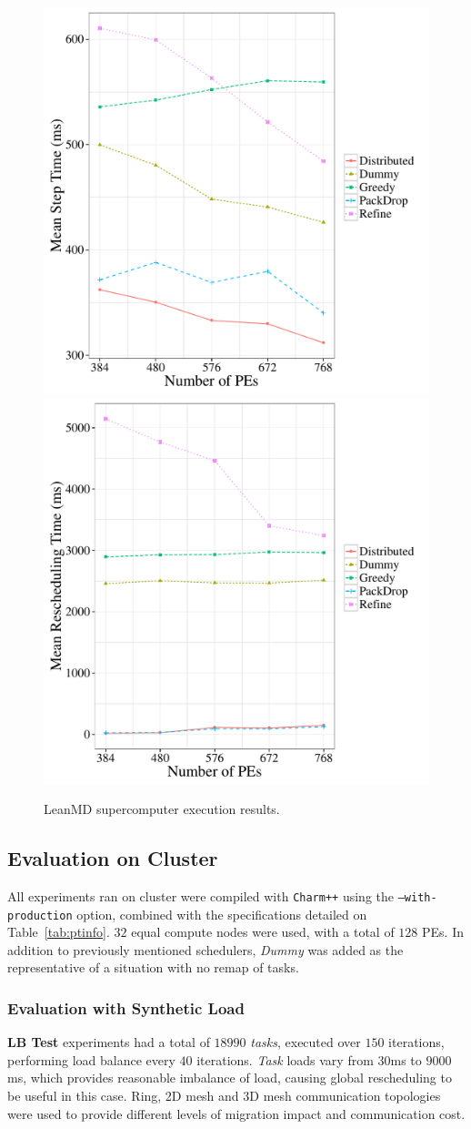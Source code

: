 \begin{figure}[!ht]
 \includegraphics[width=0.45\linewidth]{images/steptime_leanmd_sdumont.pdf}\includegraphics[width=0.45\linewidth]{images/schedtime_leanmd_sdumont.pdf}
 \caption{LeanMD supercomputer execution results.}
\end{figure}


\subsection{Evaluation on Cluster}

All experiments ran on cluster were compiled with \texttt{Charm++} using the \texttt{--with-production} option, combined with the specifications detailed on Table~\ref{tab:ptinfo}.
$32$ equal compute nodes were used, with a total of $128$ PEs.
In addition to previously mentioned schedulers, \textit{Dummy} was added as the representative of a situation with no remap of tasks.

\subsubsection*{Evaluation with Synthetic Load}

\textbf{LB Test} experiments had a total of $18990$ \textit{tasks}, executed over $150$ iterations, performing load balance every $40$ iterations.
\textit{Task} loads vary from $30$ms to $9000$ms, which provides reasonable imbalance of load, causing global rescheduling to be useful in this case.
Ring, 2D mesh and 3D mesh communication topologies were used to provide different levels of migration impact and communication cost.

